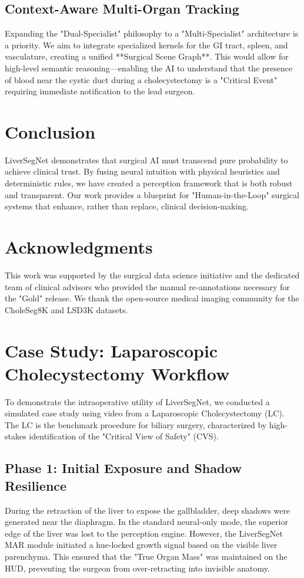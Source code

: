\documentclass[conference]{IEEEtran}
\begin{document}
\subsection{Context-Aware Multi-Organ Tracking}
Expanding the "Dual-Specialist" philosophy to a "Multi-Specialist" architecture is a priority. We aim to integrate specialized kernels for the GI tract, spleen, and vasculature, creating a unified **Surgical Scene Graph**. This would allow for high-level semantic reasoning—enabling the AI to understand that the presence of blood near the cystic duct during a cholecystectomy is a "Critical Event" requiring immediate notification to the lead surgeon.

\section{Conclusion}
LiverSegNet demonstrates that surgical AI must transcend pure probability to achieve clinical trust. By fusing neural intuition with physical heuristics and deterministic rules, we have created a perception framework that is both robust and transparent. Our work provides a blueprint for "Human-in-the-Loop" surgical systems that enhance, rather than replace, clinical decision-making.

\section{Acknowledgments}
This work was supported by the surgical data science initiative and the dedicated team of clinical advisors who provided the manual re-annotations necessary for the "Gold" release. We thank the open-source medical imaging community for the CholeSeg8K and LSD3K datasets.

\section{Case Study: Laparoscopic Cholecystectomy Workflow}
To demonstrate the intraoperative utility of LiverSegNet, we conducted a simulated case study using video from a Laparoscopic Cholecystectomy (LC). The LC is the benchmark procedure for biliary surgery, characterized by high-stakes identification of the "Critical View of Safety" (CVS).

\subsection{Phase 1: Initial Exposure and Shadow Resilience}
During the retraction of the liver to expose the gallbladder, deep shadows were generated near the diaphragm. In the standard neural-only mode, the superior edge of the liver was lost to the perception engine. However, the LiverSegNet MAR module initiated a hue-locked growth signal based on the visible liver parenchyma. This ensured that the "True Organ Mass" was maintained on the HUD, preventing the surgeon from over-retracting into invisible anatomy.
\end{document}
